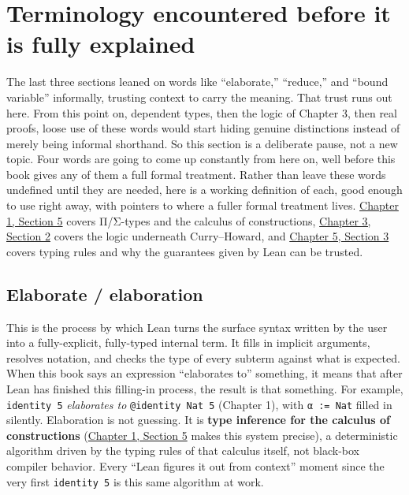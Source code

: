 \section{Terminology encountered before it is fully explained}\label{sec:01-basics:04-terminology:1}

The last three sections leaned on words like ``elaborate,'' ``reduce,'' and ``bound variable'' informally, trusting context to carry the meaning. That trust runs out here. From this point on, dependent types, then the logic of Chapter 3, then real proofs, loose use of these words would start hiding genuine distinctions instead of merely being informal shorthand. So this section is a deliberate pause, not a new topic. Four words are going to come up constantly from here on, well before this book gives any of them a full formal treatment. Rather than leave these words undefined until they are needed, here is a working definition of each, good enough to use right away, with pointers to where a fuller formal treatment lives. \hyperref[sec:01-basics:05-pi-sigma-and-coc:1]{Chapter 1, Section 5} covers Π/Σ-types and the calculus of constructions, \hyperref[sec:03-propositions-and-proofs:02-logic-recap:1]{Chapter 3, Section 2} covers the logic underneath Curry--Howard, and \hyperref[sec:05-rigor-check:03-typing-rules-and-safety:1]{Chapter 5, Section 3} covers typing rules and why the guarantees given by Lean can be trusted.

\subsection{Elaborate / elaboration}\label{sec:01-basics:04-terminology:2}

This is the process by which Lean turns the surface syntax written by the user into a fully-explicit, fully-typed internal term. It fills in implicit arguments, resolves notation, and checks the type of every subterm against what is expected. When this book says an expression ``elaborates to'' something, it means that after Lean has finished this filling-in process, the result is that something. For example, \texttt{identity 5} \emph{elaborates to} \texttt{@identity Nat 5} (Chapter 1), with \texttt{α := Nat} filled in silently. Elaboration is not guessing. It is \textbf{type inference for the calculus of constructions} (\hyperref[sec:01-basics:05-pi-sigma-and-coc:1]{Chapter 1, Section 5} makes this system precise), a deterministic algorithm driven by the typing rules of that calculus itself, not black-box compiler behavior. Every ``Lean figures it out from context'' moment since the very first \texttt{identity 5} is this same algorithm at work.

